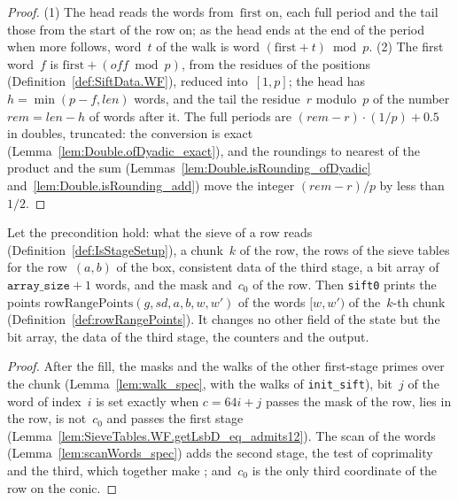 \begin{proof}
  \leanok
  (1) The head reads the words from~$\mathrm{first}$ on, each full period and the tail those from
  the start of the row on; as the head ends at the end of the period when more follows, word~$t$
  of the walk is word $(\mathrm{first} + t) \bmod p$. (2) The first word~$f$ is
  $\mathrm{first} + (\mathit{off} \bmod p)$, from the residues of the positions
  (Definition~\ref{def:SiftData.WF}), reduced into~$[1, p]$; the head has
  $h = \min(p - f, \mathit{len})$ words, and the tail the residue~$r$ modulo~$p$ of the number
  $\mathit{rem} = \mathit{len} - h$ of words after it. The full periods are
  $(\mathit{rem} - r) \cdot (1/p) + 0.5$ in doubles, truncated: the conversion is exact
  (Lemma~\ref{lem:Double.ofDyadic_exact}), and the roundings to nearest of the product and the sum
  (Lemmas~\ref{lem:Double.isRounding_ofDyadic} and~\ref{lem:Double.isRounding_add}) move the
  integer $(\mathit{rem} - r)/p$ by less than~$1/2$.
\end{proof}

\begin{lemma}\label{lem:sift0_spec}
  \leanok
  Let the precondition  hold: what the sieve of a row reads
  (Definition~\ref{def:IsStageSetup}), a chunk~$k$ of the row, the rows of the sieve tables for the
  row~$(a, b)$ of the box, consistent data of the third stage, a bit array of
  $\texttt{array\_size} + 1$ words, and the mask and~$c_0$ of the row. Then \texttt{sift0} prints
  the points $\mathrm{rowRangePoints}(g, sd, a, b, w, w')$ of the words $[w, w')$ of the~$k$-th
  chunk (Definition~\ref{def:rowRangePoints}). It changes no other field of the state but the bit
  array, the data of the third stage, the counters and the output.
\end{lemma}

\begin{proof}
  \leanok
  After the fill, the masks and the walks of the other first-stage primes over the chunk
  (Lemma~\ref{lem:walk_spec}, with the walks of \texttt{init\_sift}), bit~$j$ of the word of
  index~$i$ is set exactly when $c = 64 i + j$ passes the mask of the row, lies in the row, is
  not~$c_0$ and passes the first stage (Lemma~\ref{lem:SieveTables.WF.getLsbD_eq_admits12}). The
  scan of the words (Lemma~\ref{lem:scanWords_spec}) adds the second stage, the test of
  coprimality and the third, which together make ; and~$c_0$ is the only
  third coordinate of the row on the conic.
\end{proof}

